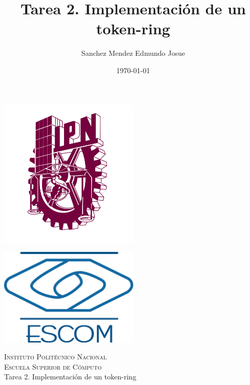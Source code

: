 \documentclass[11pt]{article}
\date{\today}
\title{Tarea 2. Implementación de un token-ring}
\author{Sanchez Mendez Edmundo Josue}
\begin{document}
		\begin{titlepage}
			\begin{center}
				
				
				\noindent
				\begin{minipage}{0.5\textwidth}
					\begin{flushleft} \large
						\includegraphics[width=0.5\textwidth]{resources/ipn.png}
					\end{flushleft}
				\end{minipage}%
				\begin{minipage}{0.55\textwidth}
					\begin{flushright} \large
						\includegraphics[width=0.5\textwidth]{resources/escom.png}
					\end{flushright}
				\end{minipage}
				
				\textsc{\LARGE Instituto Politécnico Nacional}\\[0.5cm]
				
				\textsc{\Large Escuela Superior de Cómputo}\\[1cm]
				
				
				{ \huge Tarea 2. Implementación de un token-ring  \\[1cm] }
				

\end{center}
\end{titlepage}
\end{document}
